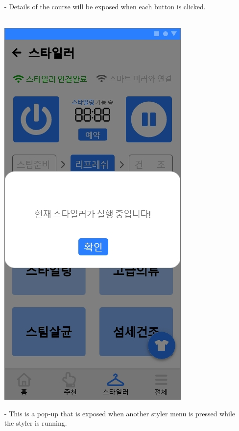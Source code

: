 \documentclass[conference]{IEEEtran}
\begin{document}
\begin{enumerate}
 \item[-]Details of the course will be exposed when each button is clicked. \\\\
   \centerline{\includegraphics[scale=0.32]{assets/스타일러7.jpg}}
 \item[-]This is a pop-up that is exposed when another styler menu is pressed while the styler is running. \\\\
 \end{enumerate}
 
\end{document}
